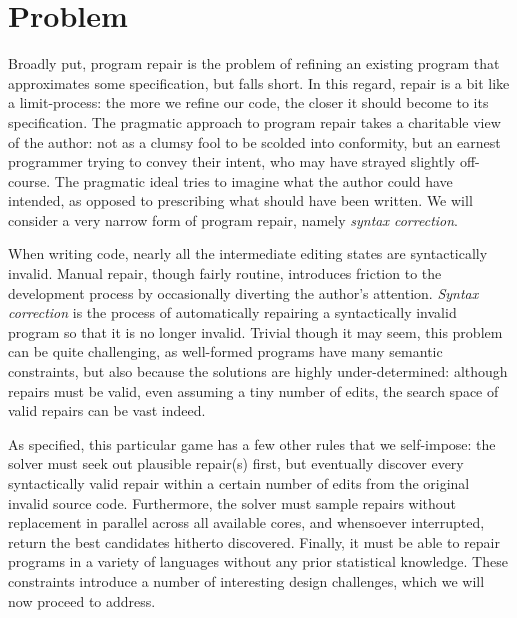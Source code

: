 \documentclass[sigplan,screen]{acmart}
\begin{document}
\section{Problem}


Broadly put, program repair is the problem of refining an existing program that approximates some specification, but falls short. In this regard, repair is a bit like a limit-process: the more we refine our code, the closer it should become to its specification. The pragmatic approach to program repair takes a charitable view of the author: not as a clumsy fool to be scolded into conformity, but an earnest programmer trying to convey their intent, who may have strayed slightly off-course. The pragmatic ideal tries to imagine what the author could have intended, as opposed to prescribing what should have been written. We will consider a very narrow form of program repair, namely \emph{syntax correction}.

When writing code, nearly all the intermediate editing states are syntactically invalid. Manual repair, though fairly routine, introduces friction to the development process by occasionally diverting the author's attention. \textit{Syntax correction} is the process of automatically repairing a syntactically invalid program so that it is no longer invalid. Trivial though it may seem, this problem can be quite challenging, as well-formed programs have many semantic constraints, but also because the solutions are highly under-determined: although repairs must be valid, even assuming a tiny number of edits, the search space of valid repairs can be vast indeed.

As specified, this particular game has a few other rules that we self-impose: the solver must seek out plausible repair(s) first, but eventually discover every syntactically valid repair within a certain number of edits from the original invalid source code. Furthermore, the solver must sample repairs without replacement in parallel across all available cores, and whensoever interrupted, return the best candidates hitherto discovered. Finally, it must be able to repair programs in a variety of languages without any prior statistical knowledge. These constraints introduce a number of interesting design challenges, which we will now proceed to address.
\end{document}

